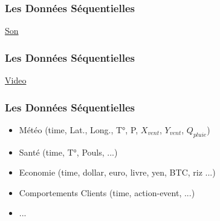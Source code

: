 \begin{frame}
  \frametitle{Les Données Séquentielles}
  \underline{Son}
\end{frame}

\begin{frame}
  \frametitle{Les Données Séquentielles}
  \underline{Video}
\end{frame}

\begin{frame}
  \frametitle{Les Données Séquentielles}
  \begin{itemize}
  \item Météo (time, Lat., Long., T°, P, $X_{vent}$, $Y_{vent}$, $Q_{pluie}$)
  \item Santé (time, T°, Pouls, ...)
  \item Economie (time, dollar, euro, livre, yen, BTC, riz ...)
  \item Comportements Clients (time, action-event, ...)
  \item ...
  \end{itemize}
\end{frame}

